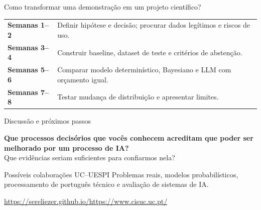 \documentclass[aspectratio=169,11pt]{beamer}
\begin{document}
\begin{frame}{Como transformar uma demonstração em um projeto científico?}
\vspace{.22cm}
\begin{center}
\end{center}
\vspace{.44cm}
\begin{tabular}{p{}p{}}
\textbf{Semanas 1--2} & Definir hipótese e decisão; procurar dados legítimos e riscos de uso.\\[6pt]
\textbf{Semanas 3--4} & Construir baseline, dataset de teste e critérios de abstenção.\\[6pt]
\textbf{Semanas 5--6} & Comparar modelo determinístico, Bayesiano e LLM com orçamento igual.\\[6pt]
\textbf{Semanas 7--8} & Testar mudança de distribuição e apresentar limites.\\
\end{tabular}
\end{frame}

\begin{frame}{Discussão e próximos passos}
\vspace{.35cm}
\begin{center}
{\Large\bfseries Que processos decisórios que vocês conhecem acreditam que poder ser melhorado por um processo de IA?}\\[.5cm]
{\large Que evidências seriam suficientes para confiarmos nela?}
\end{center}
\vspace{.55cm}
\begin{block}{Possíveis colaborações UC--UESPI}
Problemas reais, modelos probabilísticos, processamento de português técnico e avaliação de sistemas de IA.
\end{block}
\vspace{.26cm}
\begin{center}
\small \url{https://sereliezer.github.io/}\qquad\url{https://www.cisuc.uc.pt/}
\end{center}
\end{frame}
\end{document}
